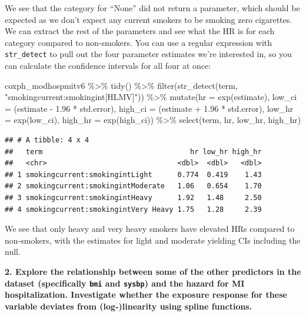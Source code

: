 \documentclass[
]{book}
\newenvironment{Shaded}{\begin{snugshade}}{\end{snugshade}}
\newcommand{\AttributeTok}[1]{\textcolor[rgb]{0.77,0.63,0.00}{#1}}
\newcommand{\FloatTok}[1]{\textcolor[rgb]{0.00,0.00,0.81}{#1}}
\newcommand{\FunctionTok}[1]{\textcolor[rgb]{0.00,0.00,0.00}{#1}}
\newcommand{\NormalTok}[1]{#1}
\newcommand{\SpecialCharTok}[1]{\textcolor[rgb]{0.00,0.00,0.00}{#1}}
\newcommand{\StringTok}[1]{\textcolor[rgb]{0.31,0.60,0.02}{#1}}
\begin{document}
We see that the category for ``None'' did not return a parameter, which should be expected as we don't expect any current smokers to be smoking zero cigarettes. We can extract the rest of the parameters and see what the HR is for each category compared to non-smokers. You can use a regular expression with \texttt{str\_detect} to pull out the four parameter estimates we're interested in, so you can calculate the confidence intervals for all four at once:

\begin{Shaded}
\begin{Highlighting}[]
\NormalTok{coxph\_modhospmitv6 }\SpecialCharTok{\%\textgreater{}\%} 
  \FunctionTok{tidy}\NormalTok{() }\SpecialCharTok{\%\textgreater{}\%} 
  \FunctionTok{filter}\NormalTok{(}\FunctionTok{str\_detect}\NormalTok{(term, }\StringTok{"smokingcurrent:smokingint[HLMV]"}\NormalTok{)) }\SpecialCharTok{\%\textgreater{}\%} 
  \FunctionTok{mutate}\NormalTok{(}\AttributeTok{hr =} \FunctionTok{exp}\NormalTok{(estimate),}
         \AttributeTok{low\_ci =}\NormalTok{ (estimate }\SpecialCharTok{{-}} \FloatTok{1.96} \SpecialCharTok{*}\NormalTok{ std.error), }
         \AttributeTok{high\_ci =}\NormalTok{ (estimate }\SpecialCharTok{+} \FloatTok{1.96} \SpecialCharTok{*}\NormalTok{ std.error), }
         \AttributeTok{low\_hr =} \FunctionTok{exp}\NormalTok{(low\_ci), }
         \AttributeTok{high\_hr =} \FunctionTok{exp}\NormalTok{(high\_ci)) }\SpecialCharTok{\%\textgreater{}\%} 
  \FunctionTok{select}\NormalTok{(term, hr, low\_hr, high\_hr)}
\end{Highlighting}
\end{Shaded}

\begin{verbatim}
## # A tibble: 4 x 4
##   term                                   hr low_hr high_hr
##   <chr>                               <dbl>  <dbl>   <dbl>
## 1 smokingcurrent:smokingintLight      0.774  0.419    1.43
## 2 smokingcurrent:smokingintModerate   1.06   0.654    1.70
## 3 smokingcurrent:smokingintHeavy      1.92   1.48     2.50
## 4 smokingcurrent:smokingintVery Heavy 1.75   1.28     2.39
\end{verbatim}

We see that only heavy and very heavy smokers have elevated HRs compared to non-smokers, with the estimates for light and moderate yielding CIs including the null.

\textbf{2. Explore the relationship between some of the other predictors in the dataset (specifically \texttt{bmi} and \texttt{sysbp}) and the hazard for MI hospitalization. Investigate whether the exposure response for these variable deviates from (log-)linearity using spline functions.}
\end{document}
